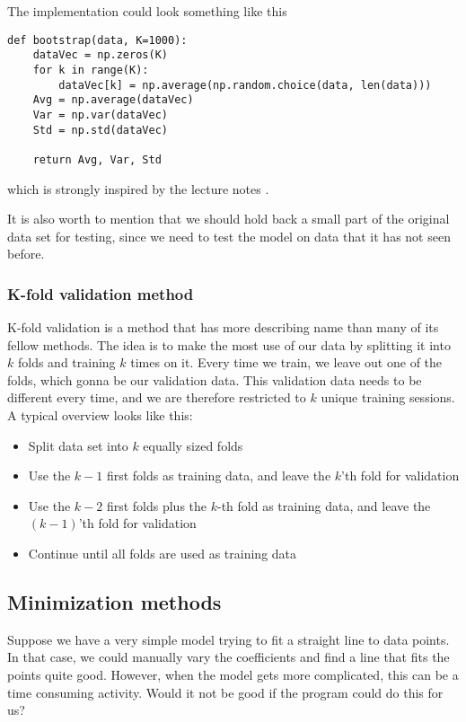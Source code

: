The implementation could look something like this
\lstset{basicstyle=\scriptsize}
\begin{lstlisting}
def bootstrap(data, K=1000):
    dataVec = np.zeros(K)
    for k in range(K):
        dataVec[k] = np.average(np.random.choice(data, len(data)))
    Avg = np.average(dataVec)
    Var = np.var(dataVec)
    Std = np.std(dataVec)
    
    return Avg, Var, Std
\end{lstlisting}
which is strongly inspired by the lecture notes \cite{Lecture}.

It is also worth to mention that we should hold back a small part of the original data set for testing, since we need to test the model on data that it has not seen before.

\subsubsection{K-fold validation method} \label{sec:kfold}
K-fold validation is a method that has more describing name than many of its fellow methods. The idea is to make the most use of our data by splitting it into $k$ folds and training $k$ times on it. Every time we train, we leave out one of the folds, which gonna be our validation data. This validation data needs to be different every time, and we are therefore restricted to $k$ unique training sessions. A typical overview looks like this:
\begin{itemize}
	\item Split data set into $k$ equally sized folds
	\item Use the $k-1$ first folds as training data, and leave the $k$'th fold for validation
	\item Use the $k-2$ first folds plus the $k$-th fold as training data, and leave the $(k-1)$'th fold for validation
	\item Continue until all folds are used as training data
\end{itemize}

\cite{Berkeley}

\subsection{Minimization methods} \label{sec:minimization}
Suppose we have a very simple model trying to fit a straight line to data points. In that case, we could manually vary the coefficients and find a line that fits the points quite good. However, when the model gets more complicated, this can be a time consuming activity. Would it not be good if the program could do this for us?


